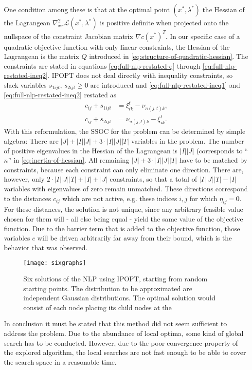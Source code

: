 One condition among these is that at the optimal point $\left(x^*,\lambda^*\right)$ the Hessian of the Lagrangean $\nabla_{xx}^2\mathcal{L}(x^*,\lambda^*)$ is positive definite when projected onto the nullspace of the constraint Jacobian matrix $\nabla c(x^*)^T$. In our specific case of a quadratic objective function with only linear constraints, the Hessian of the Lagrangean is the matrix $Q$ introduced in \eqref{eq:structure-of-quadratic-hessian}. The constraints are stated in equations \eqref{eq:full-nlp-restated-q} through \eqref{eq:full-nlp-restated-ineq2}. IPOPT does not deal directly with inequality constraints, so slack variables $s_{1ijt},\,s_{2ijt} \geq 0$ are introduced and \eqref{eq:full-nlp-restated-ineq1} and \eqref{eq:full-nlp-restated-ineq2} restated as
\begin{subequations}
\begin{align}
  \label{eq:nlp-ineq1-with-slacks}
  c_{ij} +s_{1ijt}&= \xi_{ik}^t - \nu_{n(j,t)k},\\
  c_{ij} +s_{2ijt} &= \nu_{n(j,t)k} - \xi_{ik}^t.
\end{align}
\end{subequations}
With this reformulation, the SSOC for the problem can be determined by simple algebra: There are $|J|+|I||J|+3\cdot|I||J||T|$ variables in the problem. The number of positive eigenvalues in the Hessian of the Lagrangean is $|I||J|$ (corresponds to ``$n$'' in \eqref{eq:inertia-of-hessian}. All remaining $|J|+3\cdot|I||J||T|$ have to be matched by constraints, because each constraint can only eliminate one direction. There are, however, only $2\cdot|I||J||T|+|I|+|J|$ constraints, so that a total of $|I||J||T|-|I|$ variables with eigenvalues of zero remain unmatched. These directions correspond to the distances $c_{ij}$ which are not active, e.g. these indices $i,j$ for which $\eta_{ij}=0$. For these distances, the solution is not unique, since any arbitrary feasible value chosen for them will - all else being equal - yield the same value of the objective function. Due to the barrier term that is added to the objective function, those variables $c$ will be driven arbitrarily far away from their bound, which is the behavior that was observed.
\begin{figure}
  \centering
  \texttt{[image: sixgraphs]}
  \caption{Six solutions of the NLP using IPOPT, starting from random starting points. The distribution to be approximated are independent Gaussian distributions. The optimal solution would consist of each node placing its child nodes at the }
  \label{fig:different-local-minima-with-ipopt}
\end{figure}

In conclusion it must be stated that this method did not seem sufficient to address the problem. Due to the abundance of local optima, some kind of global search has to be conducted. However, due to the poor convergence property of the explored algorithm, the local searches are not fast enough to be able to cover the search space in a reasonable time.
